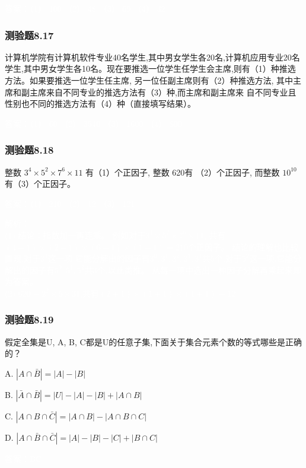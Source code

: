 \documentclass[UTF8, heading=true]{ctexart}
\begin{document}
\textcolor{white}{答案：（1） 100 （2） 48 （3） 69 （4） 32}

\subsubsection{测验题8.17}

计算机学院有计算机软件专业40名学生,其中男女学生各20名,计算机应用专业20名学生,其中男女学生各10名。现在要推选一位学生任学生会主席,则有（1）种推选方法。如果要推选一位学生任主席,
另一位任副主席则有（2）种推选方法,
其中主席和副主席来自不同专业的推选方法有（3）种,而主席和副主席来
自不同专业且性别也不同的推选方法有（4）种（直接填写结果）。

\textcolor{white}{答案：（1） 60 （2） 3540 （3） 1600 （4） 800}

\subsubsection{测验题8.18}

整数 $3^4 \times 5^2 \times 7^6 \times 11$ 有（1）个正因子, 整数 620有 （2）个正因子,
而整数 $10^{10}$ 有（3）个正因子。

\textcolor{white}{答案：（1） 210 （2） 12 （3） 121}

\textcolor{white}{解析：\\ \indent(1) 结论：指数加一再连乘。 例如对于$3^4 \times 5^2 \times 7^6 \times 11$,
共有$(4+1) \times (2+1) \times (6+1) \times (1+1)=210$个正因子。
结论的理解也比较直观,对于$3^4$这一项,它能分解出的因子有$3^0,3^1,3^2,3^3,3^4$共5个,对于$5^2$这一项,它能分解出的因子有$5^0,5^1,5^2$共3个,以此类推。
从每一项中选出一种因子分解再乘起来即为答案。\\ \indent(2) $620=2^2 \times 5 \times 31$,共有$(2+1) \times (1+1) \times (1+1)=12$}


\subsubsection{测验题8.19}

假定全集是U, A, B, C都是U的任意子集,下面关于集合元素个数的等式哪些是正确的？

A. $|A \cap \bar{B}|=|A|-|B|$

B. $|\bar{A} \cap \bar{B}|=|U|-|A|-|B|+|A \cap B|$

C. $|A \cap B \cap \bar{C}|=|A \cap B|-|A \cap B \cap C|$

D. $|A \cap \bar{B} \cap \bar{C}|=|A|-|B|-|C|+|B \cap C|$

\textcolor{white}{答案：BC}
\end{document}
